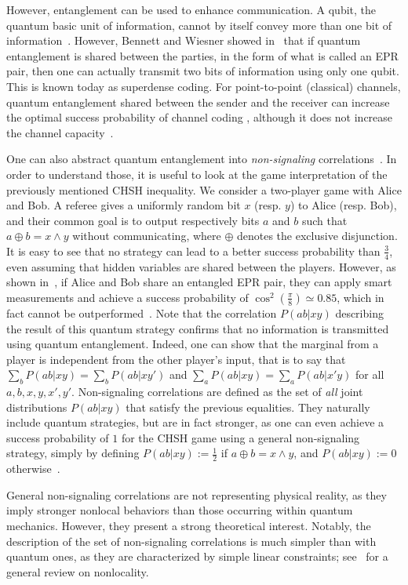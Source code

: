 However, entanglement can be used to enhance communication. A qubit, the quantum basic unit of information, cannot by itself convey more than one bit of information~\cite{Holevo73}. However, Bennett and Wiesner showed in~\cite{BW92} that if quantum entanglement is shared between the parties, in the form of what is called an EPR pair, then one can actually transmit two bits of information using only one qubit. This is known today as superdense coding. For point-to-point (classical) channels, quantum entanglement shared between the sender and the receiver can increase the optimal success probability of channel coding \cite{CLMW10,PLMKR11}, although it does not increase the channel capacity~\cite{BBCJPW93,BSST99}. 

One can also abstract quantum entanglement into \emph{non-signaling} correlations~\cite{Tsirelson80,PR94}. In order to understand those, it is useful to look at the game interpretation of the previously mentioned CHSH inequality. We consider a two-player game with Alice and Bob. A referee gives a uniformly random bit $x$ (resp. $y$) to Alice (resp. Bob), and their common goal is to output respectively bits $a$ and $b$ such that $a \oplus b = x \land y$ without communicating, where $\oplus$ denotes the exclusive disjunction. It is easy to see that no strategy can lead to a better success probability than $\frac{3}{4}$, even assuming that hidden variables are shared between the players. However, as shown in~\cite{CHSH69}, if Alice and Bob share an entangled EPR pair, they can apply smart measurements and achieve a success probability of $\cos^2\left(\frac{\pi}{8}\right) \simeq 0.85$, which in fact cannot be outperformed~\cite{Tsirelson80}. Note that the correlation $P(ab|xy)$ describing the result of this quantum strategy confirms that no information is transmitted using quantum entanglement. Indeed, one can show that the marginal from a player is independent from the other player's input, that is to say that $\sum_bP(ab|xy)=\sum_bP(ab|xy')$ and $\sum_aP(ab|xy)=\sum_aP(ab|x'y)$ for all $a,b,x,y,x',y'$. Non-signaling correlations are defined as the set of \emph{all} joint distributions $P(ab|xy)$ that satisfy the previous equalities. They naturally include quantum strategies, but are in fact stronger, as one can even achieve a success probability of $1$ for the CHSH game using a general non-signaling strategy, simply by defining $P(ab|xy):=\frac{1}{2}$ if $a \oplus b = x \land y$, and $P(ab|xy):=0$ otherwise~\cite{PR94}.

General non-signaling correlations are not representing physical reality, as they imply stronger nonlocal behaviors than those occurring within quantum mechanics. However, they present a strong theoretical interest. Notably, the description of the set of non-signaling correlations is much simpler than with quantum ones, as they are characterized by simple linear constraints; see~\cite{BCPSW14} for a general review on nonlocality.

